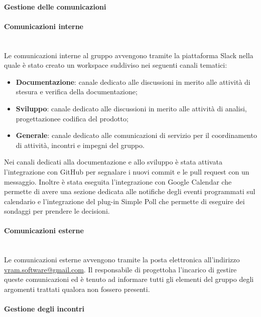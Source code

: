 		\paragraph{Gestione delle comunicazioni}
			\paragraph*{Comunicazioni interne}\mbox{}\\ [1mm]
				Le comunicazioni interne al gruppo avvengono tramite la piattaforma Slack nella quale è stato creato un workspace suddiviso nei seguenti canali tematici:
				\begin{itemize}
					\item \textbf{Documentazione}: canale dedicato alle discussioni in merito alle attività di stesura e verifica della documentazione;
					\item \textbf{Sviluppo}: canale dedicato alle discussioni in merito alle attività di analisi, progettazione\glosp e codifica del prodotto\glo;
					\item \textbf{Generale}: canale dedicato alle comunicazioni di servizio per il coordinamento di attività, incontri e impegni del gruppo.
				\end{itemize}
				Nei canali dedicati alla documentazione e allo sviluppo è stata attivata l'integrazione con GitHub per segnalare i nuovi commit e le pull request con un messaggio.
				Inoltre è stata eseguita l'integrazione con Google Calendar che permette di avere una sezione dedicata alle notifiche degli eventi programmati sul calendario e l'integrazione del plug-in Simple Poll che permette di eseguire dei sondaggi per prendere le decisioni.
			\paragraph*{Comunicazioni esterne}\mbox{}\\ [1mm]
				Le comunicazioni esterne avvengono tramite la posta elettronica all'indirizzo \url{vram.software@gmail.com}.
				Il responsabile di progetto\glosp ha l'incarico di gestire queste comunicazioni ed è tenuto ad informare tutti gli elementi del gruppo degli argomenti trattati qualora non fossero presenti.
		\paragraph{Gestione degli incontri}
